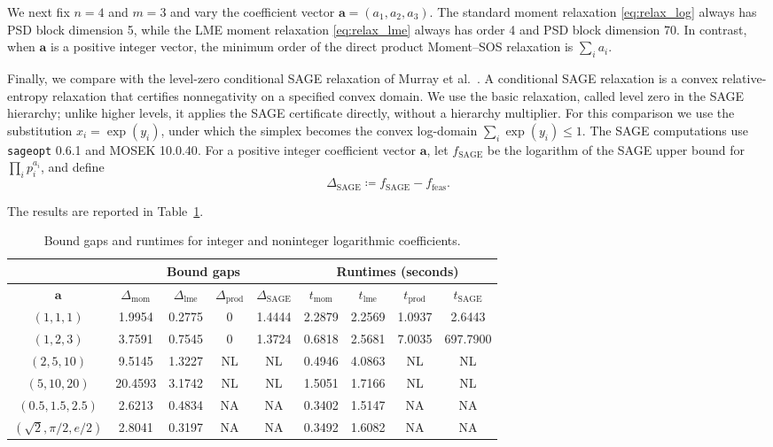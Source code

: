 \documentclass[pdflatex,sn-mathphys-num]{sn-jnl}%
\newcommand{\rd}[1]{{\color{red}#1}}
\newcommand{\vect}[1]{\boldsymbol{#1}}
\theoremstyle{thmstyleone}%
\theoremstyle{thmstyletwo}%
\theoremstyle{thmstylethree}%
\begin{document}
{We next fix $n=4$ and $m=3$ and vary the coefficient vector
$\vect{a}=(a_1,a_2,a_3)$. The standard moment relaxation
\eqref{eq:relax_log} always has PSD block dimension 5, while the LME
moment relaxation \eqref{eq:relax_lme} always has order 4 and PSD block
dimension 70. In contrast, when $\vect{a}$ is a positive integer vector, the
minimum order of the direct product Moment--SOS relaxation is
$\sum_i a_i$.

Finally, we compare with the level-zero conditional SAGE relaxation
of Murray et al.~\cite{MurraySAGE}. A conditional SAGE relaxation is
a convex relative-entropy relaxation that certifies nonnegativity on
a specified convex domain. We use the basic relaxation, called level
zero in the SAGE hierarchy; unlike higher levels, it applies the SAGE
certificate directly, without a hierarchy multiplier. For this comparison we use the substitution
$x_i=\exp(y_i)$, under which the simplex becomes the convex log-domain
$\sum_i\exp(y_i)\leq 1$. The SAGE computations use \texttt{sageopt}
0.6.1 and MOSEK \rd{10.0.40}.
For a positive integer coefficient vector $\vect{a}$, let
$f_{\mathrm{SAGE}}$ be the logarithm of the SAGE upper bound for
$\prod_i p_i^{a_i}$, and define
\[
\Delta_{\mathrm{SAGE}}
\coloneqq f_{\mathrm{SAGE}}-f_{\mathrm{feas}}.
\]

\rd{The results are reported in Table~\ref{tab:exponents}.}
\begin{table}[htb]
\centering
\caption{Bound gaps and runtimes for integer and noninteger
logarithmic coefficients.}
\label{tab:exponents}
\renewcommand{\arraystretch}{1.1}
\setlength{\tabcolsep}{3.5pt}
\begin{tabular}{|c|c|c|c|c|c|c|c|c|}
\hline
& \multicolumn{4}{c|}{Bound gaps}
& \multicolumn{4}{c|}{Runtimes (seconds)}\\
\hline
$\vect{a}$ & $\Delta_{\mathrm{mom}}$
& $\Delta_{\mathrm{lme}}$
& $\Delta_{\mathrm{prod}}$
& $\Delta_{\mathrm{SAGE}}$
& $t_{\mathrm{mom}}$
& $t_{\mathrm{lme}}$
& $t_{\mathrm{prod}}$
& $t_{\mathrm{SAGE}}$\\
\hline
$(1,1,1)$
& 1.9954 & 0.2775 & 0 & 1.4444
& 2.2879 & 2.2569 & 1.0937 & \rd{2.6443}\\
\hline
$(1,2,3)$
& 3.7591 & 0.7545 & 0 & 1.3724
& 0.6818 & 2.5681 & 7.0035 & \rd{697.7900}\\
\hline
$(2,5,10)$
& 9.5145 & 1.3227 & NL & NL
& 0.4946 & 4.0863 & NL & NL\\
\hline
$(5,10,20)$
& 20.4593 & 3.1742 & NL & NL
& 1.5051 & 1.7166 & NL & NL\\
\hline
$(0.5,1.5,2.5)$
& 2.6213 & 0.4834 & NA & NA
& 0.3402 & 1.5147 & NA & NA\\
\hline
$(\sqrt{2},\pi/2,e/2)$
& 2.8041 & 0.3197 & NA & NA
& 0.3492 & 1.6082 & NA & NA\\
\hline
\end{tabular}
\end{table}
\FloatBarrier

}
\end{document}

